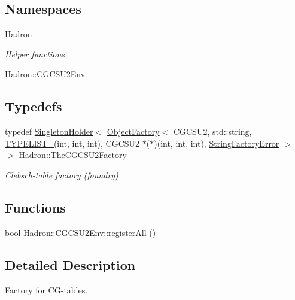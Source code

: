 \subsection*{Namespaces}
\begin{DoxyCompactItemize}
\item 
 \mbox{\hyperlink{namespaceHadron}{Hadron}}
\begin{DoxyCompactList}\small\item\em Helper functions. \end{DoxyCompactList}\item 
 \mbox{\hyperlink{namespaceHadron_1_1CGCSU2Env}{Hadron\+::\+C\+G\+C\+S\+U2\+Env}}
\end{DoxyCompactItemize}
\subsection*{Typedefs}
\begin{DoxyCompactItemize}
\item 
typedef \mbox{\hyperlink{classUtil_1_1SingletonHolder}{Singleton\+Holder}}$<$ \mbox{\hyperlink{classUtil_1_1ObjectFactory}{Object\+Factory}}$<$ C\+G\+C\+S\+U2, std\+::string, \mbox{\hyperlink{adat__devel__install_2include_2adat_2typelist_8h_a0309f68a543c5c0994f9edc0e56dc59f}{T\+Y\+P\+E\+L\+I\+S\+T\+\_}}(int, int, int), C\+G\+C\+S\+U2 $\ast$($\ast$)(int, int, int), \mbox{\hyperlink{structUtil_1_1StringFactoryError}{String\+Factory\+Error}} $>$ $>$ \mbox{\hyperlink{namespaceHadron_a78329899af02f016ab89457f10d6e6ff}{Hadron\+::\+The\+C\+G\+C\+S\+U2\+Factory}}
\begin{DoxyCompactList}\small\item\em Clebsch-\/table factory (foundry) \end{DoxyCompactList}\end{DoxyCompactItemize}
\subsection*{Functions}
\begin{DoxyCompactItemize}
\item 
bool \mbox{\hyperlink{namespaceHadron_1_1CGCSU2Env_abd79304b8b72ab5ae3e0ede4ecd647a5}{Hadron\+::\+C\+G\+C\+S\+U2\+Env\+::register\+All}} ()
\end{DoxyCompactItemize}


\subsection{Detailed Description}
Factory for C\+G-\/tables. 

